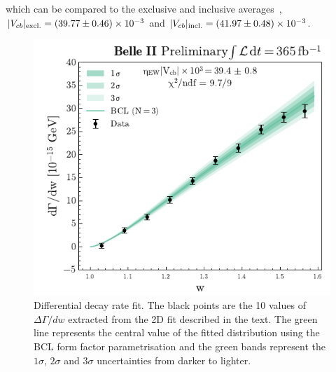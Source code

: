 \documentclass{moriond}
\def\vcb{V_{cb}}
\begin{document}
which can be compared to the exclusive and inclusive averages~\cite{hflav}, $|\vcb|_{\rm excl.} = (39.77 \pm 0.46) \times 10^{-3}$ and $|\vcb|_{\rm incl.} = (41.97 \pm 0.48) \times 10^{-3}$.
\begin{figure}[h!]
    \centering
    \includegraphics[scale=0.8]{Figures/bcl_fit.pdf}
    \caption{Differential decay rate fit. The black points are the 10 values of $\Delta\Gamma/dw$ extracted from the 2D fit described in the text. The green line represents the central value of the fitted distribution using the BCL form factor parametrisation and the green bands represent the $1\sigma$, $2\sigma$ and $3\sigma$ uncertainties from darker to lighter.}
    \label{fig:bcl_fit}
\end{figure}
\end{document}
